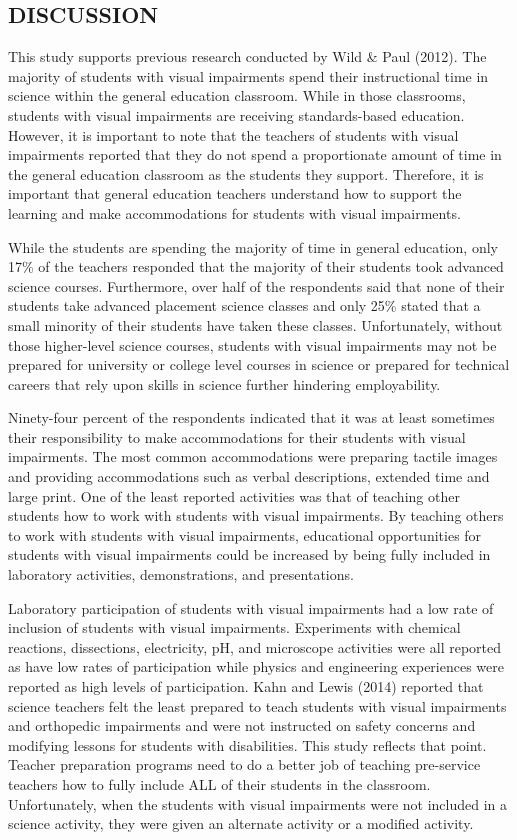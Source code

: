 \documentclass[11.5pt]{sig-alternate} %
\begin{document}
\begin{large}
\section*{DISCUSSION}

This study supports previous research conducted by Wild \& Paul (2012).  The majority of students with visual impairments spend their instructional time in science within the general education classroom.  While in those classrooms, students with visual impairments are receiving standards-based education.  However, it is important to note that the teachers of students with visual impairments reported that they do not spend a proportionate amount of time in the general education classroom as the students they support.  Therefore, it is important that general education teachers understand how to support the learning and make accommodations for students with visual impairments.  

While the students are spending the majority of time in general education, only 17\% of the teachers responded that the majority of their students took advanced science courses.  Furthermore, over half of the respondents said that none of their students take advanced placement science classes and only 25\% stated that a small minority of their students have taken these classes.  Unfortunately, without those higher-level science courses, students with visual impairments may not be prepared for university or college level courses in science or prepared for technical careers that rely upon skills in science further hindering employability.

Ninety-four percent of the respondents indicated that it was at least sometimes their responsibility to make accommodations for their students with visual impairments.  The most common accommodations were preparing tactile images and providing accommodations such as verbal descriptions, extended time and large print.  One of the least reported activities was that of teaching other students how to work with students with visual impairments.  By teaching others to work with students with visual impairments, educational opportunities for students with visual impairments could be increased by being fully included in laboratory activities, demonstrations, and presentations.  

Laboratory participation of students with visual impairments had a low rate of inclusion of students with visual impairments.  Experiments with chemical reactions, dissections, electricity, pH, and microscope activities were all reported as have low rates of participation while physics and engineering experiences were reported as high levels of participation.   Kahn and Lewis (2014) reported that science teachers felt the least prepared to teach students with visual impairments and orthopedic impairments and were not instructed on safety concerns and modifying lessons for students with disabilities.  This study reflects that point.  Teacher preparation programs need to do a better job of teaching pre-service teachers how to fully include ALL of their students in the classroom.  Unfortunately, when the students with visual impairments were not included in a science activity, they were given an alternate activity or a modified activity.  


\end{large}
\end{document}

